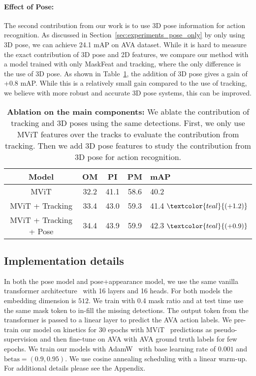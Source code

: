 \paragraph{Effect of Pose:} The second contribution from our work is to use 3D pose information for action recognition. As discussed in Section~\ref{sec:experiments_pose_only} by only using 3D pose, we can achieve 24.1 mAP on AVA dataset. While it is hard to measure the exact contribution of 3D pose and 2D features, we compare our method with a model trained with only MaskFeat and tracking, where the only difference is the use of 3D pose. As shown in Table~\ref{tbl:main_ablation}, the addition of 3D pose gives a gain of +0.8 mAP. While this is a relatively small gain compared to the use of tracking, we believe with more robust and accurate 3D pose systems, this can be improved. 


\begin{table}[!h]
\begin{center}
\small
\vspace{5pt}
\begin{tabular}{c c c c l}
\toprule[0.4mm]
Model & OM & PI & PM & mAP \\ \midrule
MViT                   & 32.2 & 41.1 & 58.6 & 40.2 \\
MViT + Tracking        & 33.4 & 43.0 & 59.3 & 41.4$\ \textcolor{teal}{(+1.2)}$ \\
MViT + Tracking + Pose & 34.4 & 43.9 & 59.9 & 42.3$\ \textcolor{teal}{(+0.9)}$ \\
\bottomrule[0.4mm]
\end{tabular}
\end{center}
\vspace{-10pt}
\caption{\textbf{Ablation on the main components:} We ablate the contribution of tracking and 3D poses using the same detections. First, we only use MViT features over the tracks to evaluate the contribution from tracking. Then we add 3D pose features to study the contribution from 3D pose for action recognition.} 
\vspace{-0.4cm}
\label{tbl:main_ablation}
\end{table}




\subsection{Implementation details}
In both the pose model and pose+appearance model, we use the same vanilla transformer architecture~\cite{vaswani2017attention} with 16 layers and 16 heads. For both models the embedding dimension is $512$. We train with 0.4 mask ratio and at test time use the same mask token to in-fill the missing detections. The output token from the transformer is passed to a linear layer to predict the AVA action labels. We pre-train our model on kinetics for 30 epochs with MViT~\cite{fan2021multiscale} predictions as pseudo-supervision and then fine-tune on AVA with AVA ground truth labels for few epochs. We train our models with AdamW~\cite{loshchilov2017decoupled} with base learning rate of $0.001$ and $\textrm{betas}=(0.9,0.95)$. We use cosine annealing scheduling with a linear warm-up. For additional details please see the Appendix.




